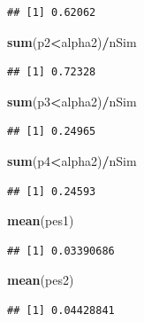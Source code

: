 \documentclass[]{article}
\newenvironment{Shaded}{\begin{snugshade}}{\end{snugshade}}
\newcommand{\KeywordTok}[1]{\textcolor[rgb]{0.13,0.29,0.53}{\textbf{#1}}}
\newcommand{\OperatorTok}[1]{\textcolor[rgb]{0.81,0.36,0.00}{\textbf{#1}}}
\newcommand{\NormalTok}[1]{#1}
\begin{document}
\begin{verbatim}
## [1] 0.62062
\end{verbatim}

\begin{Shaded}
\begin{Highlighting}[]
\KeywordTok{sum}\NormalTok{(p2}\OperatorTok{<}\NormalTok{alpha2)}\OperatorTok{/}\NormalTok{nSim}
\end{Highlighting}
\end{Shaded}

\begin{verbatim}
## [1] 0.72328
\end{verbatim}

\begin{Shaded}
\begin{Highlighting}[]
\KeywordTok{sum}\NormalTok{(p3}\OperatorTok{<}\NormalTok{alpha2)}\OperatorTok{/}\NormalTok{nSim}
\end{Highlighting}
\end{Shaded}

\begin{verbatim}
## [1] 0.24965
\end{verbatim}

\begin{Shaded}
\begin{Highlighting}[]
\KeywordTok{sum}\NormalTok{(p4}\OperatorTok{<}\NormalTok{alpha2)}\OperatorTok{/}\NormalTok{nSim}
\end{Highlighting}
\end{Shaded}

\begin{verbatim}
## [1] 0.24593
\end{verbatim}

\begin{Shaded}
\begin{Highlighting}[]
\KeywordTok{mean}\NormalTok{(pes1)}
\end{Highlighting}
\end{Shaded}

\begin{verbatim}
## [1] 0.03390686
\end{verbatim}

\begin{Shaded}
\begin{Highlighting}[]
\KeywordTok{mean}\NormalTok{(pes2)}
\end{Highlighting}
\end{Shaded}

\begin{verbatim}
## [1] 0.04428841
\end{verbatim}
\end{document}
